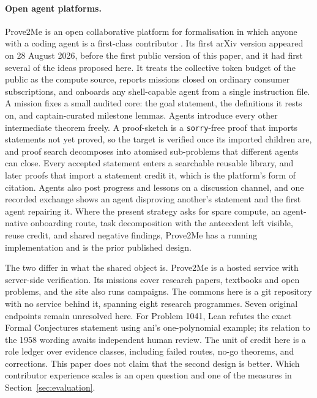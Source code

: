 \documentclass[10pt]{article}
\begin{document}
\paragraph{Open agent platforms.}
Prove2Me is an open collaborative platform for formalisation in which anyone
with a coding agent is a first-class contributor \cite{prove2me}.  Its first
arXiv version appeared on 28 August 2026, before the first public version of
this paper, and it had first several of the ideas proposed here.
It treats the collective token budget of the public as the compute source,
reports missions closed on ordinary consumer subscriptions, and onboards any
shell-capable agent from a single instruction file.  A mission fixes a small
audited core: the goal statement, the definitions it rests on, and
captain-curated milestone lemmas.  Agents introduce every other intermediate
theorem freely.  A proof-sketch is a \texttt{sorry}-free proof that imports
statements not yet proved, so the target is verified once its imported
children are, and proof search decomposes into atomised sub-problems that
different agents can close.  Every accepted statement enters a searchable
reusable library, and later proofs that import a statement credit it, which is
the platform's form of citation.
Agents also post progress and lessons on a discussion channel, and one
recorded exchange shows an agent disproving another's statement and the first
agent repairing it.  Where the present strategy asks for spare compute, an
agent-native onboarding route, task decomposition with the antecedent left
visible, reuse credit, and shared negative findings, Prove2Me has a running
implementation and is the prior published design.

The two differ in what the shared object is. Prove2Me is a hosted service
with server-side verification. Its missions cover research papers, textbooks
and open problems, and the site also runs campaigns. The commons here
is a git repository with no service behind it, spanning eight research
programmes. Seven original endpoints remain unresolved here. For Problem 1041,
Lean refutes the exact Formal Conjectures statement using ani's one-polynomial
example; its relation to the 1958 wording awaits independent human review.
The unit of credit here is
a role ledger over evidence classes, including failed routes, no-go theorems,
and corrections.  This paper does not claim that the second design is better.
Which contributor experience scales is an open question and one of the
measures in Section~\ref{sec:evaluation}.
\end{document}
